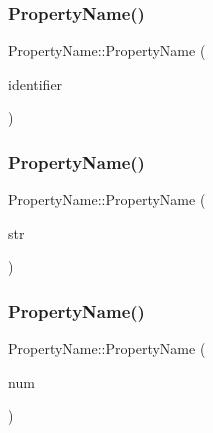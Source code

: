 \subsubsection{\texorpdfstring{Property\+Name()}{PropertyName()}\hspace{0.1cm}{\footnotesize\ttfamily [1/3]}}
{\footnotesize\ttfamily Property\+Name\+::\+Property\+Name (\begin{DoxyParamCaption}\item[{\hyperlink{struct_identifier}{Identifier} $\ast$}]{identifier }\end{DoxyParamCaption})\hspace{0.3cm}{\ttfamily [inline]}}

\mbox{\label{struct_property_name_a25d0acdb06061901c645912a4f1db913}} 
\subsubsection{\texorpdfstring{Property\+Name()}{PropertyName()}\hspace{0.1cm}{\footnotesize\ttfamily [2/3]}}
{\footnotesize\ttfamily Property\+Name\+::\+Property\+Name (\begin{DoxyParamCaption}\item[{\hyperlink{struct_string_literal}{String\+Literal} $\ast$}]{str }\end{DoxyParamCaption})\hspace{0.3cm}{\ttfamily [inline]}}

\mbox{\label{struct_property_name_a438f7d48c16360a5c86d20f717d30c39}} 
\subsubsection{\texorpdfstring{Property\+Name()}{PropertyName()}\hspace{0.1cm}{\footnotesize\ttfamily [3/3]}}
{\footnotesize\ttfamily Property\+Name\+::\+Property\+Name (\begin{DoxyParamCaption}\item[{\hyperlink{struct_numeric_literal}{Numeric\+Literal} $\ast$}]{num }\end{DoxyParamCaption})\hspace{0.3cm}{\ttfamily [inline]}}




